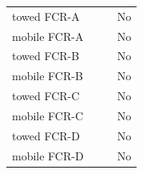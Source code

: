 \begin{tabularx}{0.5\linewidth}{Lccc}
towed FCR-A&&&No\\
mobile FCR-A&&&No\\
towed FCR-B&&&No\\
mobile FCR-B&&&No\\
towed FCR-C&&&No\\
mobile FCR-C&&&No\\
towed FCR-D&&&No\\
mobile FCR-D&&&No\\
\bottomrule
\end{tabularx}
